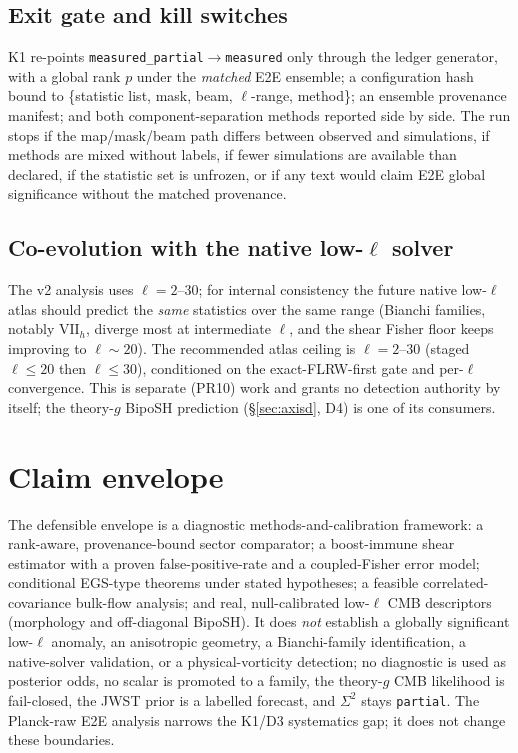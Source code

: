 \documentclass[11pt]{article}
\newcommand{\code}[1]{\texttt{\small #1}}
\newcommand{\Sig}{\Sigma^2}
\begin{document}
\subsection{Exit gate and kill switches}
K1 re-points \code{measured\_partial}$\to$\code{measured} only through the ledger
generator, with a global rank $p$ under the \emph{matched} E2E ensemble; a
configuration hash bound to \{statistic list, mask, beam, $\ell$-range, method\};
an ensemble provenance manifest; and both component-separation methods reported
side by side. The run stops if the map/mask/beam path differs between observed
and simulations, if methods are mixed without labels, if fewer simulations are
available than declared, if the statistic set is unfrozen, or if any text would
claim E2E global significance without the matched provenance.

\subsection{Co-evolution with the native low-$\ell$ solver}
The v2 analysis uses $\ell=2$--$30$; for internal consistency the future native
low-$\ell$ atlas should predict the \emph{same} statistics over the same range
(Bianchi families, notably $\mathrm{VII}_h$, diverge most at intermediate $\ell$,
and the shear Fisher floor keeps improving to $\ell\sim20$). The recommended
atlas ceiling is $\ell=2$--$30$ (staged $\ell\le20$ then $\ell\le30$),
conditioned on the exact-FLRW-first gate and per-$\ell$ convergence. This is
separate (PR10) work and grants no detection authority by itself; the theory-$g$
BipoSH prediction (\S\ref{sec:axisd}, D4) is one of its consumers.

\section{Claim envelope}\label{sec:envelope}
The defensible envelope is a diagnostic methods-and-calibration framework: a
rank-aware, provenance-bound sector comparator; a boost-immune shear estimator
with a proven false-positive-rate and a coupled-Fisher error model; conditional
EGS-type theorems under stated hypotheses; a feasible correlated-covariance
bulk-flow analysis; and real, null-calibrated low-$\ell$ CMB descriptors
(morphology and off-diagonal BipoSH). It does \emph{not} establish a globally
significant low-$\ell$ anomaly, an anisotropic geometry, a Bianchi-family
identification, a native-solver validation, or a physical-vorticity detection;
no diagnostic is used as posterior odds, no scalar is promoted to a family, the
theory-$g$ CMB likelihood is fail-closed, the JWST prior is a labelled forecast,
and $\Sig$ stays \code{partial}. The Planck-raw E2E analysis narrows the K1/D3
systematics gap; it does not change these boundaries.
\end{document}
